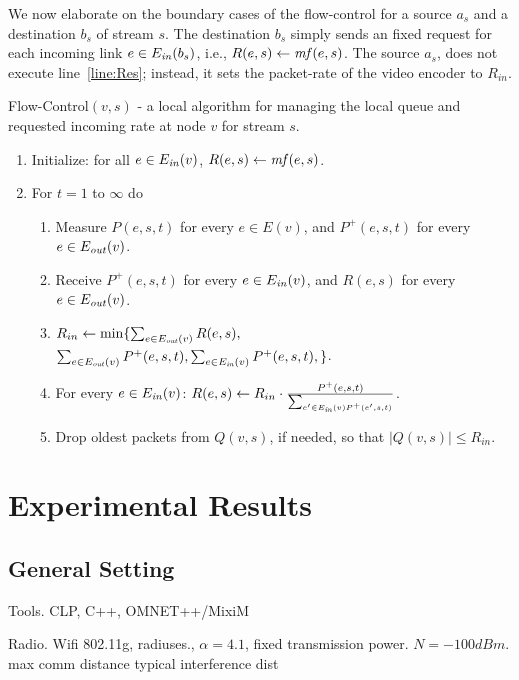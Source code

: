 \documentclass[12pt]{article}
\newenvironment{proof sketch}[1]{\noindent {\emph{Proof sketch of #1:}}}{\hfill \qed}
\newcommand{\mf}{\text{\emph{mf}}}
\newcommand{\Ein}{E_{\text{\emph{in}}}}
\newcommand{\Eout}{E_{\text{\emph{out}}}}
\begin{document}
We now elaborate on the boundary cases of the flow-control for a
source $a_s$ and a destination $b_s$ of stream $s$.  The destination
$b_s$ simply sends an fixed request for each incoming link $e\in \Ein(b_s)$, i.e.,
$R(e,s)\gets \mf(e,s)$.  The source $a_s$, does not execute
line~\ref{line:Res}; instead, it sets the packet-rate of the video
encoder to $R_{in}$.


\begin{algorithm}
  \caption{Flow-Control$(v,s)$ - a local algorithm for managing the
    local queue and requested incoming rate at node $v$ for stream
    $s$.}
\label{alg:FC}
  \begin{enumerate}
  \item Initialize: for all $e\in \Ein(v)$, $R(e,s)\gets \mf(e,s)$.
  \item For $t=1$ to $\infty$ do
    \begin{enumerate}
    \item Measure $P(e,s,t)$ for every $e\in E(v)$, and $P^+(e,s,t)$ for every $e\in\Eout(v)$.
    \item Receive $P^+(e,s,t)$ for every $e\in\Ein(v)$, and $R(e,s)$ for every $e\in \Eout(v)$.
    \item \label{line:Rin}
$R_{in} \gets \min\{\sum_{e\in\Eout(v)} R(e,s),$\\
$ \sum_{e\in\Eout(v)} P^+(e,s,t), \sum_{e\in\Ein(v)} P^+(e,s,t),
            \}$.
          \item \label{line:Res}
For every $e\in\Ein(v)$: $R(e,s) \gets R_{in} \cdot
            \frac{P^+(e,s,t)}{\sum_{e'\in\Ein(v) P^+(e',s,t)}}$.
            \item Drop oldest packets from $Q(v,s)$, if needed, so
              that $|Q(v,s)|\leq R_{in}$.
    \end{enumerate}
  \end{enumerate}
\end{algorithm}

\section{Experimental Results}
\subsection{General Setting}

Tools. CLP, C++, OMNET++/MixiM

Radio. Wifi 802.11g, radiuses., $\alpha=4.1$, fixed transmission power.
$N=-100dBm$.
max comm distance
typical interference dist
\end{document}
